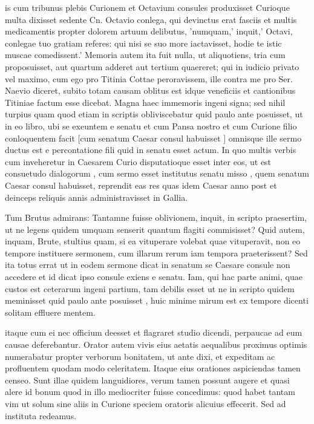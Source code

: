  is cum tribunus plebis Curionem et Octavium consules produxisset Curioque multa dixisset sedente Cn. Octavio conlega, qui devinctus erat fasciis et multis medicamentis propter dolorem artuum delibutus, 'numquam,' inquit,' Octavi, conlegae tuo gratiam referes: qui nisi se suo more iactavisset, hodie te istic muscae comedissent.' Memoria autem ita fuit nulla, ut aliquotiens, tria cum proposuisset, aut quartum adderet aut tertium quaereret; qui in iudicio privato vel maximo, cum ego pro Titinia Cottae peroravissem, ille contra me pro Ser. Naevio diceret, subito totam causam oblitus est idque veneficiis et cantionibus Titiniae factum esse dicebat. Magna haec immemoris ingeni signa; sed nihil turpius quam quod etiam in scriptis obliviscebatur quid paulo ante posuisset, ut in eo libro, ubi se exeuntem e senatu et cum Pansa nostro et cum Curione filio conloquentem facit [cum senatum Caesar consul habuisset ] omnisque ille sermo ductus est e percontatione fili quid in senatu esset actum. In quo multis verbis cum inveheretur in Caesarem Curio disputatioque esset inter eos, ut est consuetudo dialogorum , cum sermo esset institutus senatu misso , quem senatum Caesar consul habuisset, reprendit eas res quas idem Caesar anno post et deinceps reliquis annis administravisset in Gallia.

 Tum Brutus admirans: Tantamne fuisse oblivionem, inquit, in scripto praesertim, ut ne legens quidem umquam senserit quantum flagiti commisisset? Quid autem, inquam, Brute, stultius quam, si ea vituperare volebat quae vituperavit, non eo tempore instituere sermonem, cum illarum rerum iam tempora praeterissent? Sed ita totus errat ut in eodem sermone dicat in senatum se Caesare consule non accedere et id dicat ipso consule exiens e senatu. Iam, qui hac parte animi, quae custos est ceterarum ingeni partium, tam debilis esset ut ne in scripto quidem meminisset quid paulo ante posuisset , huic minime mirum est ex tempore dicenti solitam effluere mentem.

 itaque cum ei nec officium deesset et flagraret studio dicendi, perpaucae ad eum causae deferebantur. Orator autem vivis eius aetatis aequalibus proximus optimis numerabatur propter verborum bonitatem, ut ante dixi, et expeditam ac profluentem quodam modo celeritatem. Itaque eius orationes aspiciendas tamen censeo. Sunt illae quidem languidiores, verum tamen possunt augere et quasi alere id bonum quod in illo mediocriter fuisse concedimus: quod habet tantam vim ut solum sine aliis in Curione speciem oratoris alicuius effecerit. Sed ad instituta redeamus.

